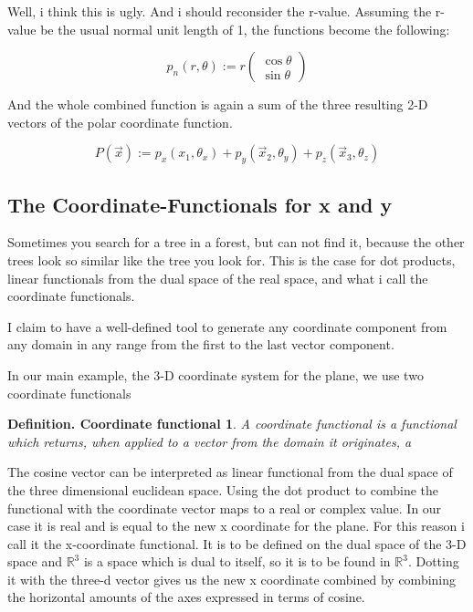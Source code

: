 \documentclass[a4paper]{article}
\begin{document}
Well, i think this is ugly. And i should reconsider the r-value. Assuming the r-value be the usual normal unit length of 1, the functions become the following:

\begin{displaymath}
p_{n}(r, \theta) := r\begin{pmatrix}\cos\theta\\\sin\theta\end{pmatrix}
\end{displaymath}

And the whole combined function is again a sum of the three resulting 2-D vectors of the polar coordinate function.

\begin{displaymath}
P(\vec{x}) := p_{x}(x_{1}, \theta_{x}) + p_{y}(\vec{x}_{2}, \theta_{y}) + p_{z}(\vec{x}_{3}, \theta_{z})
\end{displaymath}



\subsection{The Coordinate-Functionals for x and y}

Sometimes you search for a tree in a forest, but can not find it, because the other trees look so similar like the tree you look for. 
This is the case for dot products, linear functionals from the dual space of the real space, and what i call the coordinate functionals.

I claim to have a well-defined tool to generate any coordinate component from any domain in any range from the first to the last vector component.

In our main example, the 3-D coordinate system for the plane, we use two coordinate functionals

\newtheorem{Coordinate_Functional}{Definition. Coordinate functional}
\begin{Coordinate_Functional}
A coordinate functional is a functional which returns, when applied to a vector from the domain it originates, a 
\end{Coordinate_Functional}





The cosine vector can be interpreted as linear functional from the dual space of the three dimensional euclidean space. Using the dot product to combine the functional with the coordinate vector maps to a real or complex value. In our case it is real and is equal to the new x coordinate for the plane. For this reason i call it the x-coordinate functional. It is to be defined on the dual space of the 3-D space and $\mathbb{R}^{3}$ is a space which is dual to itself, so it is to be found in $\mathbb{R}^{3}$. Dotting it with the three-d vector gives us the new x coordinate combined by combining the horizontal amounts of the axes expressed in terms of cosine.
\end{document}
